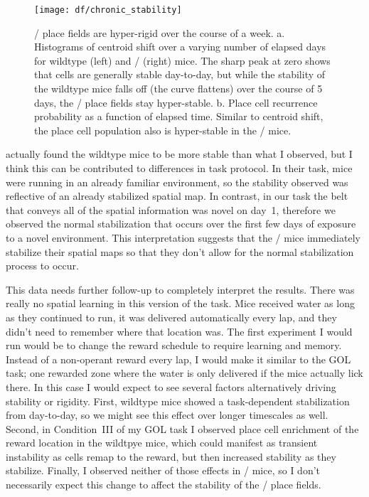 \begin{figure}
	\centering
	\texttt{[image: df/chronic\_stability]}
	\caption[\df/ place fields are hyper-rigid over the course of a week]{\df/ place fields are hyper-rigid over the course of a week.
	a. Histograms of centroid shift over a varying number of elapsed days for wildtype (left) and \df/ (right) mice. The sharp peak at zero shows that cells are generally stable day-to-day, but while the stability of the wildtype mice falls off (the curve flattens) over the course of 5 days, the \df/ place fields stay hyper-stable.
	b. Place cell recurrence probability as a function of elapsed time. Similar to centroid shift, the place cell population also is hyper-stable in the \df/ mice.}
	\label{fig:conclusions:chronic_stability}
\end{figure}

\citeauthor{Ziv2013} actually found the wildtype mice to be more stable than what I observed, but I think this can be contributed to differences in task protocol.
In their task, mice were running in an already familiar environment, so the stability observed was reflective of an already stabilized spatial map.
In contrast, in our task the belt that conveys all of the spatial information was novel on day~1, therefore we observed the normal stabilization that occurs over the first few days of exposure to a novel environment.
This interpretation suggests that the \df/ mice immediately stabilize their spatial maps so that they don't allow for the normal stabilization process to occur.

This data needs further follow-up to completely interpret the results.
There was really no spatial learning in this version of the task.
Mice received water as long as they continued to run, it was delivered automatically every lap, and they didn't need to remember where that location was.
The first experiment I would run would be to change the reward schedule to require learning and memory.
Instead of a non-operant reward every lap, I would make it similar to the \ac{GOL} task; one rewarded zone where the water is only delivered if the mice actually lick there.
In this case I would expect to see several factors alternatively driving stability or rigidity.
First, wildtype mice showed a task-dependent stabilization from day-to-day, so we might see this effect over longer timescales as well.
Second, in Condition~III of my \ac{GOL} task I observed place cell enrichment of the reward location in the wildtpye mice, which could manifest as transient instability as cells remap to the reward, but then increased stability as they stabilize.
Finally, I observed neither of those effects in \df/ mice, so I don't necessarily expect this change to affect the stability of the \df/ place fields.

